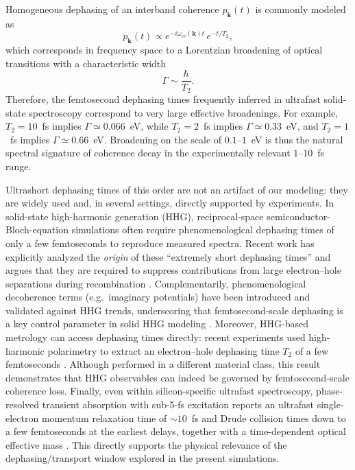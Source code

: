 Homogeneous dephasing of an interband coherence $p_{\mathbf{k}}(t)$ is commonly modeled as
\begin{equation}
p_{\mathbf{k}}(t)\propto e^{-i\omega_{cv}(\mathbf{k})t}\,e^{-t/T_2},
\end{equation}
which corresponds in frequency space to a Lorentzian broadening of optical transitions with a characteristic width
\begin{equation}
\Gamma \sim \frac{\hbar}{T_2}.
\label{eq:Gamma_T2_applicability}
\end{equation}
Therefore, the femtosecond dephasing times frequently inferred in ultrafast solid-state spectroscopy correspond to very large effective broadenings. For example, $T_2=10$~fs implies $\Gamma\simeq 0.066$~eV, while $T_2=2$~fs implies $\Gamma\simeq 0.33$~eV, and $T_2=1$~fs implies $\Gamma\simeq 0.66$~eV. Broadening on the scale of $0.1$--$1$~eV is thus the natural spectral signature of coherence decay in the experimentally relevant $1$--$10$~fs range.

Ultrashort dephasing times of this order are not an artifact of our modeling: they are widely used and, in several settings, directly supported by experiments.
In solid-state high-harmonic generation (HHG), reciprocal-space semiconductor-Bloch-equation simulations often require phenomenological dephasing times of only a few femtoseconds to reproduce measured spectra. Recent work has explicitly analyzed the \emph{origin} of these ``extremely short dephasing times'' and argues that they are required to suppress contributions from large electron--hole separations during recombination \cite{PhysRevResearch.6.043005}. Complementarily, phenomenological decoherence terms (e.g.\ imaginary potentials) have been introduced and validated against HHG trends, underscoring that femtosecond-scale dephasing is a key control parameter in solid HHG modeling \cite{PhysRevA.103.063109}.
Moreover, HHG-based metrology can access dephasing times directly: recent experiments used high-harmonic polarimetry to extract an electron--hole dephasing time $T_2$ of a few femtoseconds \cite{Heide:22}. Although performed in a different material class, this result demonstrates that HHG observables can indeed be governed by femtosecond-scale coherence loss.
Finally, even within silicon-specific ultrafast spectroscopy, phase-resolved transient absorption with sub-5-fs excitation reports an ultrafast single-electron momentum relaxation time of $\sim 10$~fs and Drude collision times down to a few femtoseconds at the earliest delays, together with a time-dependent optical effective mass \cite{Worle2021}. This directly supports the physical relevance of the dephasing/transport window explored in the present simulations.

